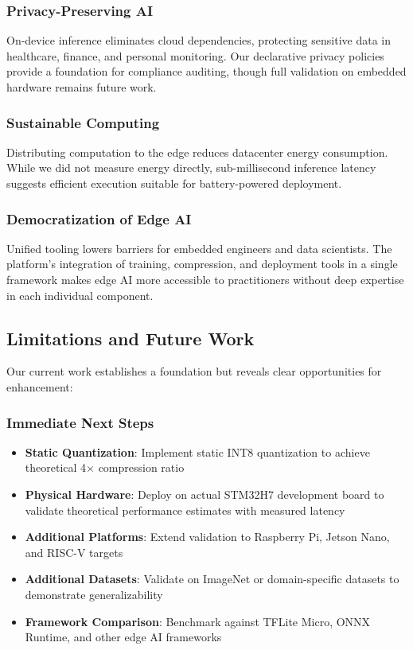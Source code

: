 \subsubsection{Privacy-Preserving AI}
On-device inference eliminates cloud dependencies, protecting sensitive data in healthcare, finance, and personal monitoring. Our declarative privacy policies provide a foundation for compliance auditing, though full validation on embedded hardware remains future work.

\subsubsection{Sustainable Computing}
Distributing computation to the edge reduces datacenter energy consumption. While we did not measure energy directly, sub-millisecond inference latency suggests efficient execution suitable for battery-powered deployment.

\subsubsection{Democratization of Edge AI}
Unified tooling lowers barriers for embedded engineers and data scientists. The platform's integration of training, compression, and deployment tools in a single framework makes edge AI more accessible to practitioners without deep expertise in each individual component.

\subsection{Limitations and Future Work}

Our current work establishes a foundation but reveals clear opportunities for enhancement:

\subsubsection{Immediate Next Steps}
\begin{itemize}
\item \textbf{Static Quantization}: Implement static INT8 quantization to achieve theoretical 4$\times$ compression ratio
\item \textbf{Physical Hardware}: Deploy on actual STM32H7 development board to validate theoretical performance estimates with measured latency
\item \textbf{Additional Platforms}: Extend validation to Raspberry Pi, Jetson Nano, and RISC-V targets
\item \textbf{Additional Datasets}: Validate on ImageNet or domain-specific datasets to demonstrate generalizability
\item \textbf{Framework Comparison}: Benchmark against TFLite Micro, ONNX Runtime, and other edge AI frameworks
\end{itemize}

